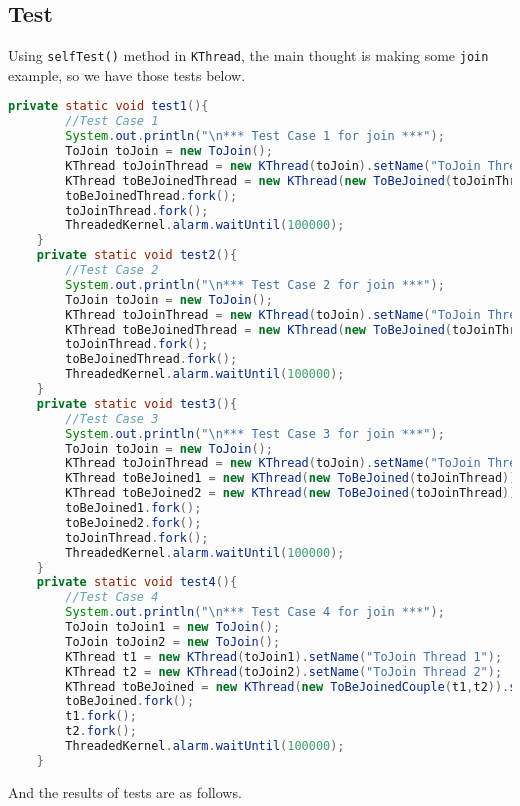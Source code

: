 \documentclass{article}
\begin{document}
\subsection{Test}
Using \texttt{selfTest()} method in \texttt{KThread}, the main thought is making some \texttt{join} example, so we have those tests below.
\begin{lstlisting}[language=java]
	private static void test1(){
		//Test Case 1
		System.out.println("\n*** Test Case 1 for join ***");
		ToJoin toJoin = new ToJoin();
		KThread toJoinThread = new KThread(toJoin).setName("ToJoin Thread");
		KThread toBeJoinedThread = new KThread(new ToBeJoined(toJoinThread)).setName("ToBeJoined Thread");
		toBeJoinedThread.fork();
		toJoinThread.fork();
		ThreadedKernel.alarm.waitUntil(100000);
	}
	private static void test2(){
		//Test Case 2
		System.out.println("\n*** Test Case 2 for join ***");
		ToJoin toJoin = new ToJoin();
		KThread toJoinThread = new KThread(toJoin).setName("ToJoin Thread");
		KThread toBeJoinedThread = new KThread(new ToBeJoined(toJoinThread)).setName("ToBeJoined Thread");
		toJoinThread.fork();
		toBeJoinedThread.fork();
		ThreadedKernel.alarm.waitUntil(100000);
	}
	private static void test3(){
		//Test Case 3
		System.out.println("\n*** Test Case 3 for join ***");
		ToJoin toJoin = new ToJoin();
		KThread toJoinThread = new KThread(toJoin).setName("ToJoin Thread");
		KThread toBeJoined1 = new KThread(new ToBeJoined(toJoinThread)).setName("ToBeJoined1 Thread");
		KThread toBeJoined2 = new KThread(new ToBeJoined(toJoinThread)).setName("ToBeJoined2 Thread");
		toBeJoined1.fork();
		toBeJoined2.fork();
		toJoinThread.fork();
		ThreadedKernel.alarm.waitUntil(100000);
	}
	private static void test4(){
		//Test Case 4
		System.out.println("\n*** Test Case 4 for join ***");
		ToJoin toJoin1 = new ToJoin();
		ToJoin toJoin2 = new ToJoin();
		KThread t1 = new KThread(toJoin1).setName("ToJoin Thread 1");
		KThread t2 = new KThread(toJoin2).setName("ToJoin Thread 2");
		KThread toBeJoined = new KThread(new ToBeJoinedCouple(t1,t2)).setName("ToBeJoined Thread");
		toBeJoined.fork();
		t1.fork();
		t2.fork();
		ThreadedKernel.alarm.waitUntil(100000);
	}
\end{lstlisting}
And the results of tests are as follows.
\end{document}
